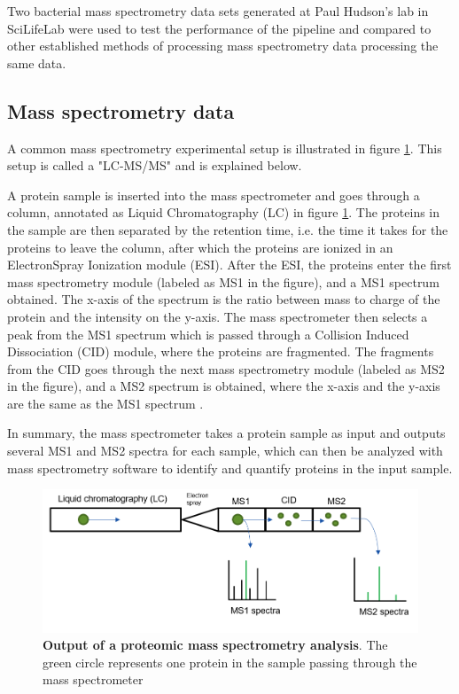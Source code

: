 Two bacterial mass spectrometry data sets generated at Paul Hudson's lab in SciLifeLab were used to test the performance of the pipeline and compared to other established methods of processing mass spectrometry data processing the same data.

\subsection{Mass spectrometry data}

A common mass spectrometry experimental setup is illustrated in figure \ref{fig:mass-spec}. This setup is called a "LC-MS/MS" and is explained below.

A protein sample is inserted into the mass spectrometer and goes through a column, annotated as Liquid Chromatography (LC) in figure \ref{fig:mass-spec}. The proteins in the sample are then separated by the retention time, i.e. the time it takes for the proteins to leave the column, after which the proteins are ionized in an ElectronSpray Ionization module (ESI). After the ESI, the proteins enter the first mass spectrometry module (labeled as MS1 in the figure), and a MS1 spectrum obtained. The x-axis of the spectrum is the ratio between mass to charge of the protein and the intensity on the y-axis. The mass spectrometer then selects a peak from the MS1 spectrum which is passed through a Collision Induced Dissociation (CID) module, where the proteins are fragmented. The fragments from the CID goes through the next mass spectrometry module (labeled as MS2 in the figure), and a MS2 spectrum is obtained, where the x-axis and the y-axis are the same as the MS1 spectrum \cite{quantitative_analysis}.

In summary, the mass spectrometer takes a protein sample as input and outputs several MS1 and MS2 spectra for each sample, which can then be analyzed with mass spectrometry software to identify and quantify proteins in the input sample.

\begin{figure}[H]
  \includegraphics[width=\linewidth]{pictures/mass_spec.png}
  \caption{\textbf{Output of a proteomic mass spectrometry analysis}. The green circle represents one protein in the sample passing through the mass spectrometer}
  \label{fig:mass-spec}
\end{figure}

